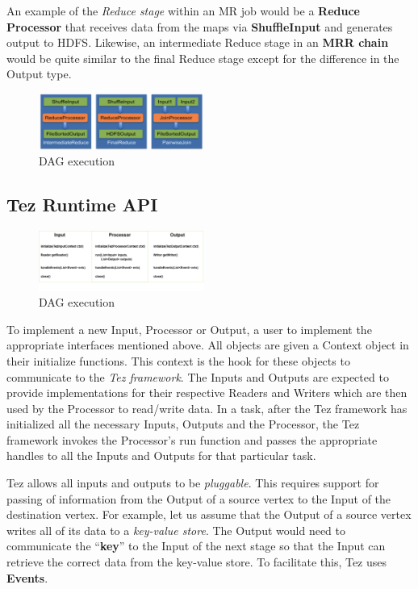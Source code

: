 \documentclass[twocolumn]{article}
\begin{document}
An example of the \emph{Reduce stage} within an MR job would be a
\textbf{Reduce Processor} that receives data from the maps via
\textbf{ShuffleInput} and generates output to HDFS. Likewise, an
intermediate Reduce stage in an \textbf{MRR chain} would be quite
similar to the final Reduce stage except for the difference in the
Output type.

\begin{figure}[htb]
        \centering
        \includegraphics[width=0.48\textwidth]{tez12}
        \caption{DAG execution}
        \label{fig10}
\end{figure}


\subsection{Tez Runtime API}

\begin{figure}[htb]
        \centering
        \includegraphics[width=0.48\textwidth]{tez32}
        \caption{DAG execution}
        \label{fig11}
\end{figure}


To implement a new Input, Processor or Output, a user to implement the
appropriate interfaces mentioned above. All objects are given a Context
object in their initialize functions. This context is the hook for these
objects to communicate to the \emph{Tez framework}. The Inputs and
Outputs are expected to provide implementations for their respective
Readers and Writers which are then used by the Processor to read/write
data. In a task, after the Tez framework has initialized all the
necessary Inputs, Outputs and the Processor, the Tez framework invokes
the Processor's run function and passes the appropriate handles to all
the Inputs and Outputs for that particular task.

Tez allows all inputs and outputs to be \emph{pluggable}. This requires
support for passing of information from the Output of a source vertex to
the Input of the destination vertex. For example, let us assume that the
Output of a source vertex writes all of its data to a \emph{key-value
store}. The Output would need to communicate the ``\textbf{key}'' to the
Input of the next stage so that the Input can retrieve the correct data
from the key-value store. To facilitate this, Tez uses \textbf{Events}.
\end{document}
